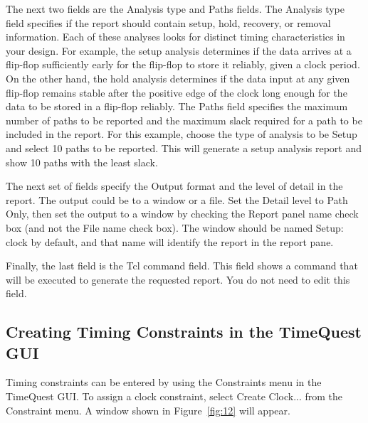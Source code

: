\documentclass[11pt, twoside, pdftex]{article}
\begin{document}
The next two fields are the {\sf Analysis type} and {\sf Paths} fields. The {\sf Analysis type} 
field specifies if the report should contain setup, hold,
recovery, or removal information. Each of these analyses looks for distinct timing 
characteristics in your design. For example, the setup analysis determines if the data arrives 
at a flip-flop sufficiently early for the flip-flop to store it reliably, given a clock period. 
On the other hand, the hold analysis determines if the data input at any given flip-flop remains 
stable after the positive edge of the clock long enough for the data to be
stored in a flip-flop reliably. The {\sf Paths} field specifies the maximum number of paths to 
be reported and the maximum slack required for a path to be included in the report. For this 
example, choose the type of analysis to be {\sf Setup} and select 10 paths to be reported. This 
will generate a setup analysis report and show 10 paths with the least slack.

The next set of fields specify the {\sf Output} format and the level of detail in the report. 
The output could be to a window or a file. Set the Detail level to {\sf Path Only}, then set 
the output to a window by checking the {\sf Report panel name} check box (and not 
the {\sf File name} check box). The window should be named {\sf Setup: clock} by default,
and that name will identify the report in the report pane.

Finally, the last field is the {\sf Tcl command} field. This field shows a command that will 
be executed to generate the requested report. You do not need to edit this field. 

\subsection{Creating Timing Constraints in the TimeQuest GUI}

Timing constraints can be entered by using the {\sf Constraints} menu in the 
TimeQuest GUI.  To assign a clock constraint, select {\sf Create Clock...} from the 
{\sf Constraint} menu. A window shown in Figure~\ref{fig:12} will appear.
\end{document}
